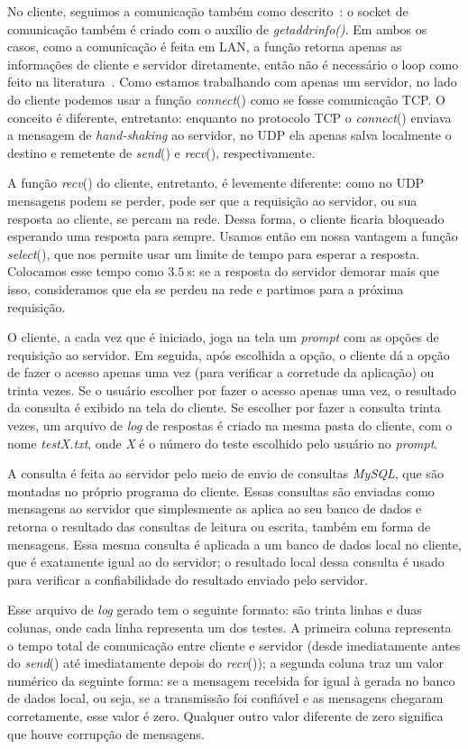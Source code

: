 \documentclass[12pt,a4paper]{article}
\begin{document}
No cliente, seguimos a comunicação também como descrito~\cite{hall19beej}: o socket de comunicação também é criado com o auxílio de {\it getaddrinfo()}. Em ambos os casos, como a comunicação é feita em LAN, a função retorna apenas as informações de cliente e servidor diretamente, então não é necessário o loop como feito na literatura~\cite{hall19beej}. Como estamos trabalhando com apenas um servidor, no lado do cliente podemos usar a função {\it connect}() como se fosse comunicação TCP. O conceito é diferente, entretanto: enquanto no protocolo TCP o {\it connect}() enviava a mensagem de {\it hand-shaking} ao servidor, no UDP ela apenas salva localmente o destino e remetente de {\it send}() e {\it recv}(), respectivamente.

A função {\it recv}() do cliente, entretanto, é levemente diferente: como no UDP mensagens podem se perder, pode ser que a requisição ao servidor, ou sua resposta ao cliente, se percam na rede. Dessa forma, o cliente ficaria bloqueado esperando uma resposta para sempre. Usamos então em nossa vantagem a função {\it select}(), que nos permite usar um limite de tempo para esperar a resposta. Colocamos esse tempo como $\SI{3.5}{\second}$: se a resposta do servidor demorar mais que isso, consideramos que ela se perdeu na rede e partimos para a próxima requisição.

O cliente, a cada vez que é iniciado, joga na tela um {\it prompt} com as opções de requisição ao servidor. Em seguida, após escolhida a opção, o cliente dá a opção de fazer o acesso apenas uma vez (para verificar a corretude da aplicação) ou trinta vezes. Se o usuário escolher por fazer o acesso apenas uma vez, o resultado da consulta é exibido na tela do cliente. Se escolher por fazer a consulta trinta vezes, um arquivo de {\it log} de respostas é criado na mesma pasta do cliente, com o nome {\it testX.txt}, onde {\it X} é o número do teste escolhido pelo usuário no {\it prompt}.

A consulta é feita ao servidor pelo meio de envio de consultas {\it MySQL}, que são montadas no próprio programa do cliente. Essas consultas são enviadas como mensagens ao servidor que simplesmente as aplica ao seu banco de dados e retorna o resultado das consultas de leitura ou escrita, também em forma de mensagens. Essa mesma consulta é aplicada a um banco de dados local no cliente, que é exatamente igual ao do servidor; o resultado local dessa consulta é usado para verificar a confiabilidade do resultado enviado pelo servidor.

Esse arquivo de {\it log} gerado tem o seguinte formato: são trinta linhas e duas colunas, onde cada linha representa um dos testes. A primeira coluna representa o tempo total de comunicação entre cliente e servidor (desde imediatamente antes do {\it send}() até imediatamente depois do {\it recv}()); a segunda coluna traz um valor numérico da seguinte forma: se a mensagem recebida for igual à gerada no banco de dados local, ou seja, se a transmissão foi confiável e as mensagens chegaram corretamente, esse valor é zero. Qualquer outro valor diferente de zero significa que houve corrupção de mensagens. 
\end{document}
